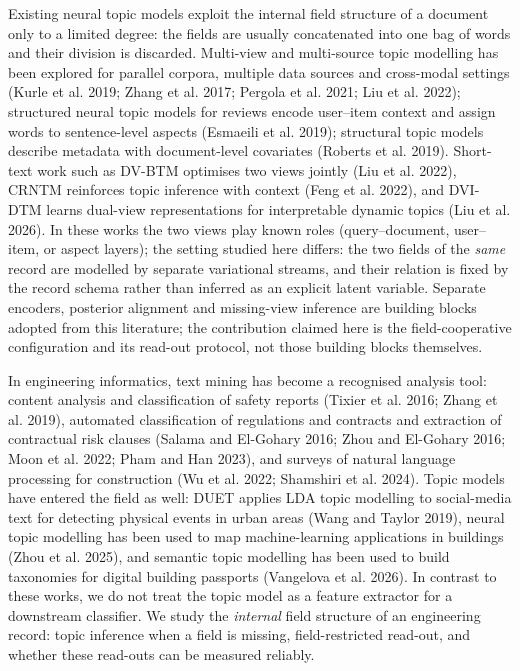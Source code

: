 \documentclass[Journal,letterpaper,NoLists]{ascelike-new}
\begin{document}
Existing neural topic models exploit the internal field structure of a document only to a limited
degree: the fields are usually concatenated into one bag of words and their division is discarded.
Multi-view and multi-source topic modelling has been explored for parallel corpora, multiple data
sources and cross-modal settings
(Kurle et al. 2019; Zhang et al. 2017; Pergola
  et al. 2021; Liu et al. 2022); structured
neural topic models for reviews encode user--item context and assign words to sentence-level
aspects (Esmaeili
  et al. 2019); structural topic models describe metadata with
document-level covariates (Roberts et al. 2019). Short-text work such as DV-BTM optimises two
views jointly (Liu et al. 2022), CRNTM reinforces topic
inference with context (Feng et al. 2022), and DVI-DTM learns dual-view representations for
interpretable dynamic topics (Liu et al. 2026). In these works the two views play known roles
(query--document, user--item, or aspect layers); the setting studied here differs: the two fields
of the \emph{same} record are modelled by separate variational streams, and their relation is
fixed by the record schema rather than inferred as an explicit latent variable.  Separate
encoders, posterior alignment and missing-view inference are building blocks adopted from this
literature; the contribution claimed here is the field-cooperative configuration and its
read-out protocol, not those building blocks themselves.

In engineering informatics, text mining has become a recognised analysis tool: content analysis and
classification of safety reports (Tixier et al. 2016; Zhang et al. 2019), automated classification
of regulations and contracts and extraction of contractual risk clauses
(Salama and El-Gohary 2016; Zhou and El-Gohary 2016; Moon et al. 2022; Pham and Han 2023), and surveys of natural language processing for
construction (Wu et al. 2022; Shamshiri et al. 2024). Topic models have entered the field as well: DUET
applies LDA topic modelling to social-media text for detecting physical events in urban areas
(Wang and Taylor 2019), neural topic modelling has
been used to map machine-learning applications in buildings (Zhou et al. 2025), and semantic
topic modelling has been used to build taxonomies for digital building passports (Vangelova et al. 2026). In contrast to
these works, we do not treat the topic model as a feature extractor for a downstream classifier.
We study the \emph{internal} field structure of an engineering record: topic inference when a field
is missing, field-restricted read-out, and whether these read-outs can be measured reliably.
\end{document}
